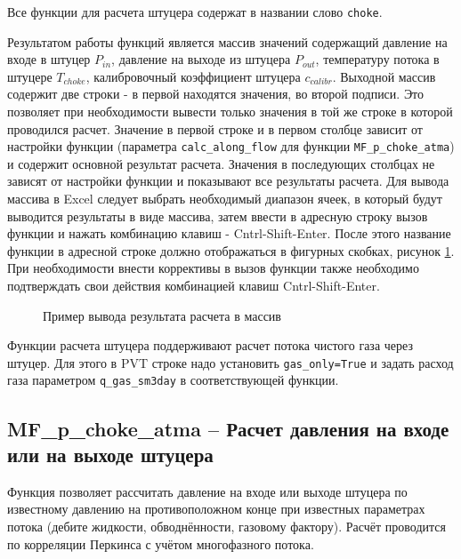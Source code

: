 Все функции для расчета штуцера содержат в названии слово \texttt{choke}. 
 
Результатом работы функций является массив значений содержащий давление на входе в штуцер $P_{in}$, давление на выходе из штуцера $P_{out}$, температуру потока в штуцере $T_{choke}$, калибровочный коэффициент штуцера $c_{calibr}$.  Выходной массив содержит две строки - в первой находятся значения, во второй подписи. Это позволяет при необходимости вывести только значения в той же строке в которой проводился расчет. Значение в первой строке и в первом столбце зависит от настройки функции (параметра \texttt{calc_along_flow} для функции \texttt{MF_p_choke_atma}) и содержит основной результат расчета. Значения в последующих столбцах не зависят от настройки функции и показывают все результаты расчета.
Для вывода массива в Excel следует выбрать необходимый диапазон ячеек, в который будут выводится результаты в виде массива, затем ввести в адресную строку вызов функции и нажать комбинацию клавиш - Cntrl-Shift-Enter. После этого название функции в адресной строке должно отображаться в фигурных скобках, рисунок \ref{ris:choke_array_out}. При необходимости внести коррективы в вызов функции также необходимо подтверждать свои действия комбинацией клавиш Cntrl-Shift-Enter.


\begin{figure}[ht]
	\caption{Пример вывода результата расчета в массив}
	\label{ris:choke_array_out}
\end{figure}

Функции расчета штуцера поддерживают расчет потока чистого газа через штуцер. Для этого в PVT строке надо установить \texttt{gas_only=True} и задать расход газа параметром \texttt{q_gas_sm3day} в соответствующей функции. 

\subsection{MF\_p\_choke\_atma – Расчет давления на входе или на выходе штуцера}
Функция позволяет рассчитать давление на входе или выходе штуцера по известному давлению на противоположном конце при известных параметрах потока (дебите жидкости, обводнённости, газовому фактору). Расчёт проводится по корреляции Перкинса \cite{Perkins_1993} с учётом многофазного потока. 
 



